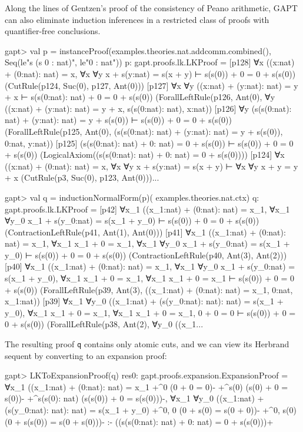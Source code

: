 \documentclass[a4paper,11pt]{book}
\begin{document}
Along the lines of Gentzen's proof of the consistency of Peano arithmetic,
GAPT can also eliminate induction inferences in a restricted class of proofs
with quantifier-free conclusions.

\begin{clilisting}
gapt> val p = instanceProof(examples.theories.nat.addcomm.combined(),                                     Seq(le"s (s 0 : nat)", le"0 : nat"))
p: gapt.proofs.lk.LKProof =
[p128] ∀x ((x:nat) + (0:nat): nat) = x,
∀x ∀y x + s(y:nat) = s(x + y)
⊢
s(s(0)) + 0 = 0 + s(s(0))    (CutRule(p124, Suc(0), p127, Ant(0)))
[p127] ∀x ∀y ((x:nat) + (y:nat): nat) = y + x ⊢ s(s(0:nat): nat) + 0 = 0 + s(s(0))    (ForallLeftRule(p126, Ant(0), ∀y ((x:nat) + (y:nat): nat) = y + x, s(s(0:nat): nat), x:nat))
[p126] ∀y (s(s(0:nat): nat) + (y:nat): nat) = y + s(s(0)) ⊢ s(s(0)) + 0 = 0 + s(s(0))    (ForallLeftRule(p125, Ant(0), (s(s(0:nat): nat) + (y:nat): nat) = y + s(s(0)), 0:nat, y:nat))
[p125] (s(s(0:nat): nat) + 0: nat) = 0 + s(s(0)) ⊢ s(s(0)) + 0 = 0 + s(s(0))    (LogicalAxiom((s(s(0:nat): nat) + 0: nat) = 0 + s(s(0))))
[p124] ∀x ((x:nat) + (0:nat): nat) = x,
∀x ∀y x + s(y:nat) = s(x + y)
⊢
∀x ∀y x + y = y + x    (CutRule(p3, Suc(0), p123, Ant(0)))...

gapt> val q = inductionNormalForm(p)(                                         examples.theories.nat.ctx)
q: gapt.proofs.lk.LKProof =
[p42] ∀x_1 ((x_1:nat) + (0:nat): nat) = x_1,
∀x_1 ∀y_0 x_1 + s(y_0:nat) = s(x_1 + y_0)
⊢
s(s(0)) + 0 = 0 + s(s(0))    (ContractionLeftRule(p41, Ant(1), Ant(0)))
[p41] ∀x_1 ((x_1:nat) + (0:nat): nat) = x_1,
∀x_1 x_1 + 0 = x_1,
∀x_1 ∀y_0 x_1 + s(y_0:nat) = s(x_1 + y_0)
⊢
s(s(0)) + 0 = 0 + s(s(0))    (ContractionLeftRule(p40, Ant(3), Ant(2)))
[p40] ∀x_1 ((x_1:nat) + (0:nat): nat) = x_1,
∀x_1 ∀y_0 x_1 + s(y_0:nat) = s(x_1 + y_0),
∀x_1 x_1 + 0 = x_1,
∀x_1 x_1 + 0 = x_1
⊢
s(s(0)) + 0 = 0 + s(s(0))    (ForallLeftRule(p39, Ant(3), ((x_1:nat) + (0:nat): nat) = x_1, 0:nat, x_1:nat))
[p39] ∀x_1 ∀y_0 ((x_1:nat) + (s(y_0:nat): nat): nat) = s(x_1 + y_0),
∀x_1 x_1 + 0 = x_1,
∀x_1 x_1 + 0 = x_1,
0 + 0 = 0
⊢
s(s(0)) + 0 = 0 + s(s(0))    (ForallLeftRule(p38, Ant(2), ∀y_0 ((x_1...

\end{clilisting}

The resulting proof \texttt{q} contains only atomic cuts, and we can view its Herbrand
sequent by converting to an expansion proof:

\begin{clilisting}
gapt> LKToExpansionProof(q)
res0: gapt.proofs.expansion.ExpansionProof =
∀x_1 ((x_1:nat) + (0:nat): nat) = x_1
  +^{0} (0 + 0 = 0)-
  +^{s(0)} (s(0) + 0 = s(0))-
  +^{s(s(0): nat)} (s(s(0)) + 0 = s(s(0)))-,
∀x_1 ∀y_0 ((x_1:nat) + (s(y_0:nat): nat): nat) = s(x_1 + y_0)
  +^{0, 0} (0 + s(0) = s(0 + 0))-
  +^{0, s(0)} (0 + s(s(0)) = s(0 + s(0)))-
:-
((s(s(0:nat): nat) + 0: nat) = 0 + s(s(0)))+

\end{clilisting}
\end{document}
